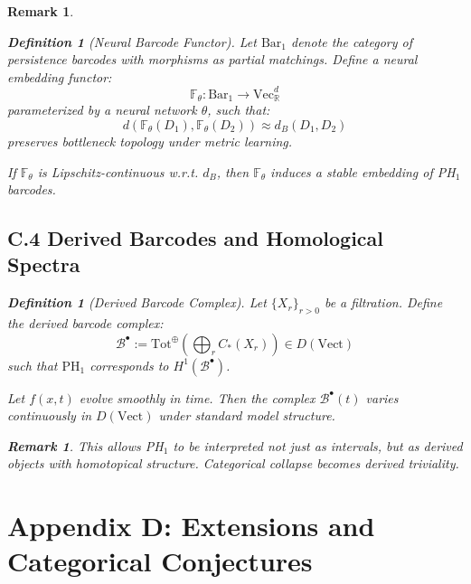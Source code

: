 \documentclass[11pt]{article}
\newtheorem{definition}[theorem]{Definition}
\newtheorem{remark}[theorem]{Remark}
\begin{document}
\begin{remark}
\begin{definition}[Neural Barcode Functor]
Let $\mathrm{Bar}_1$ denote the category of persistence barcodes with morphisms as partial matchings. Define a neural embedding functor:
\[
\mathbb{F}_\theta: \mathrm{Bar}_1 \to \mathrm{Vec}_\mathbb{R}^d
\]
parameterized by a neural network $\theta$, such that:
\[
d(\mathbb{F}_\theta(D_1), \mathbb{F}_\theta(D_2)) \approx d_B(D_1, D_2)
\]
preserves bottleneck topology under metric learning.
\end{definition}

\begin{lemma}
If $\mathbb{F}_\theta$ is Lipschitz-continuous w.r.t. $d_B$, then $\mathbb{F}_\theta$ induces a stable embedding of PH$_1$ barcodes.
\end{lemma}

\subsection*{C.4 Derived Barcodes and Homological Spectra}

\begin{definition}[Derived Barcode Complex]
Let $\{X_r\}_{r > 0}$ be a filtration.  
Define the derived barcode complex:
\[
\mathcal{B}^\bullet := \mathrm{Tot}^\oplus \left( \bigoplus_{r} C_*(X_r) \right) \in D(\text{Vect})
\]
such that $\mathrm{PH}_1$ corresponds to $H^1(\mathcal{B}^\bullet)$.
\end{definition}

\begin{proposition}
Let $f(x,t)$ evolve smoothly in time. Then the complex $\mathcal{B}^\bullet(t)$ varies continuously in $D(\text{Vect})$ under standard model structure.
\end{proposition}

\begin{remark}
This allows PH$_1$ to be interpreted not just as intervals, but as derived objects with homotopical structure. Categorical collapse becomes derived triviality.
\end{remark}




\section*{Appendix D: Extensions and Categorical Conjectures}


\end{remark}
\end{document}
